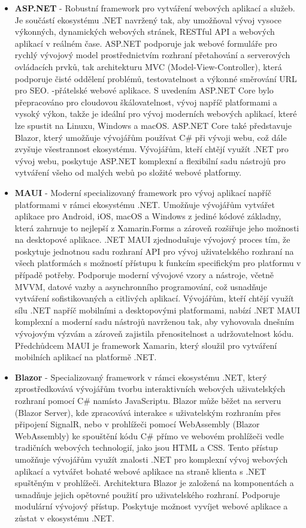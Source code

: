 \begin{itemize}
    \item \textbf{ASP.NET} - Robustní framework pro vytváření webových aplikací a služeb. Je součástí ekosystému .NET navržený tak, aby umožňoval vývoj vysoce výkonných, dynamických webových stránek, RESTful API a webových aplikací v reálném čase. ASP.NET podporuje jak webové formuláře pro rychlý vývojový model prostřednictvím rozhraní přetahování a serverových ovládacích prvků, tak architekturu MVC (Model-View-Controller), která podporuje čisté oddělení problémů, testovatelnost a výkonné směrování URL pro SEO. -přátelské webové aplikace. S uvedením ASP.NET Core bylo přepracováno pro cloudovou škálovatelnost, vývoj napříč platformami a vysoký výkon, takže je ideální pro vývoj moderních webových aplikací, které lze spustit na Linuxu, Windows a macOS. ASP.NET Core také představuje Blazor, který umožňuje vývojářům používat C\# při vývoji webu, což dále zvyšuje všestrannost ekosystému. Vývojářům, kteří chtějí využít .NET pro vývoj webu, poskytuje ASP.NET komplexní a flexibilní sadu nástrojů pro vytváření všeho od malých webů po složité webové platformy.
    \item \textbf{MAUI} - Moderní specializovaný framework pro vývoj aplikací napříč platformami v rámci ekosystému .NET. Umožňuje vývojářům vytvářet aplikace pro Android, iOS, macOS a Windows z jediné kódové základny, která zahrnuje to nejlepší z Xamarin.Forms a zároveň rozšiřuje jeho možnosti na desktopové aplikace. .NET MAUI zjednodušuje vývojový proces tím, že poskytuje jednotnou sadu rozhraní API pro vývoj uživatelského rozhraní na všech platformách s možností přístupu k funkcím specifickým pro platformu v případě potřeby. Podporuje moderní vývojové vzory a nástroje, včetně MVVM, datové vazby a asynchronního programování, což usnadňuje vytváření sofistikovaných a citlivých aplikací. Vývojářům, kteří chtějí využít sílu .NET napříč mobilními a desktopovými platformami, nabízí .NET MAUI komplexní a moderní sadu nástrojů navrženou tak, aby vyhovovala dnešním vývojovým výzvám a zároveň zajistila přenositelnost a udržovatelnost kódu.
    Předchůdcem MAUI je framework Xamarin, který sloužil pro vytváření mobilních aplikací na platformě .NET.
    \item \textbf{Blazor} - Specializovaný framework v rámci ekosystému .NET, který zprostředkovává vývojářům tvorbu interaktivních webových uživatelských rozhraní pomocí C\# namísto JavaScriptu. Blazor může běžet na serveru (Blazor Server), kde zpracovává interakce s uživatelským rozhraním přes připojení SignalR, nebo v prohlížeči pomocí WebAssembly (Blazor WebAssembly) ke spouštění kódu C\# přímo ve webovém prohlížeči vedle tradičních webových technologií, jako jsou HTML a CSS. Tento přístup umožňuje vývojářům využít znalosti .NET pro komplexní vývoj webových aplikací a vytvářet bohaté webové aplikace na straně klienta s .NET spuštěným v prohlížeči. Architektura Blazor je založená na komponentách a usnadňuje jejich opětovné použití pro uživatelského rozhraní. Podporuje modulární vývojový přístup. Poskytuje možnost vyvíjet webové aplikace a zůstat v ekosystému .NET.
\end{itemize}


